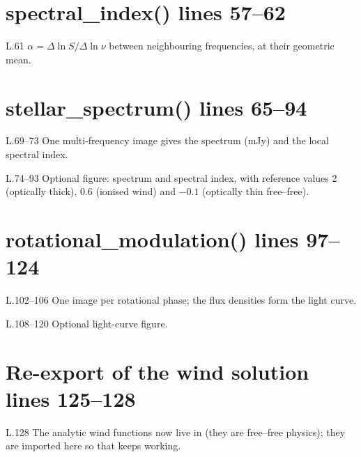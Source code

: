 \section*{\normalsize spectral\_index() \hfill{\small\mdseries\color{gray}lines 57--62}}

\begin{lines}
\item[L.61] $\alpha=\Delta\ln S/\Delta\ln\nu$ between neighbouring frequencies, at their geometric mean.
\end{lines}
\section*{\normalsize stellar\_spectrum() \hfill{\small\mdseries\color{gray}lines 65--94}}

\begin{lines}
\item[L.69–73] One multi-frequency image gives the spectrum (mJy) and the local spectral index.
\item[L.74–93] Optional figure: spectrum and spectral index, with reference values 2 (optically thick), 0.6 (ionised wind) and $-0.1$ (optically thin free--free).
\end{lines}
\section*{\normalsize rotational\_modulation() \hfill{\small\mdseries\color{gray}lines 97--124}}

\begin{lines}
\item[L.102–106] One image per rotational phase; the flux densities form the light curve.
\item[L.108–120] Optional light-curve figure.
\end{lines}
\section*{\normalsize Re-export of the wind solution \hfill{\small\mdseries\color{gray}lines 125--128}}

\begin{lines}
\item[L.128] The analytic wind functions now live in  (they are free--free physics); they are imported here so that  keeps working.
\end{lines}

